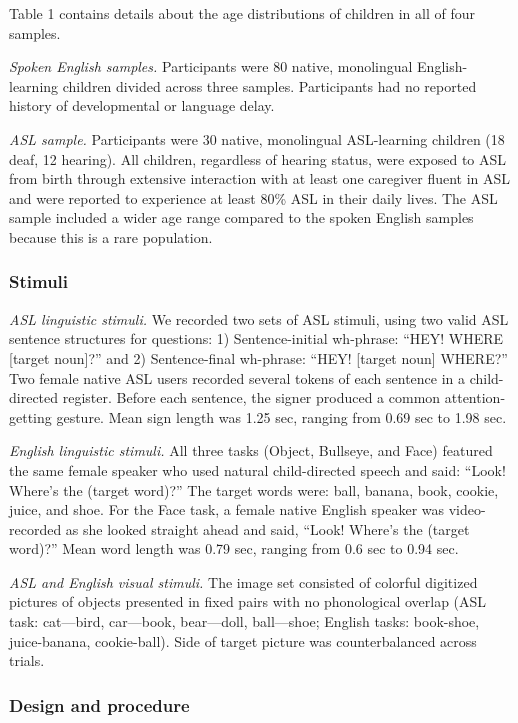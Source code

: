 \documentclass[10pt, letterpaper]{article}
\begin{document}
Table 1 contains details about the age distributions of children in all
of four samples.

\emph{Spoken English samples.} Participants were 80 native, monolingual
English-learning children divided across three samples. Participants had
no reported history of developmental or language delay.

\emph{ASL sample.} Participants were 30 native, monolingual ASL-learning
children (18 deaf, 12 hearing). All children, regardless of hearing
status, were exposed to ASL from birth through extensive interaction
with at least one caregiver fluent in ASL and were reported to
experience at least 80\% ASL in their daily lives. The ASL sample
included a wider age range compared to the spoken English samples
because this is a rare population.

\subsubsection{Stimuli}\label{stimuli}

\emph{ASL linguistic stimuli.} We recorded two sets of ASL stimuli,
using two valid ASL sentence structures for questions: 1)
Sentence-initial wh-phrase: ``HEY! WHERE {[}target noun{]}?'' and 2)
Sentence-final wh-phrase: ``HEY! {[}target noun{]} WHERE?'' Two female
native ASL users recorded several tokens of each sentence in a
child-directed register. Before each sentence, the signer produced a
common attention-getting gesture. Mean sign length was 1.25 sec, ranging
from 0.69 sec to 1.98 sec.

\emph{English linguistic stimuli.} All three tasks (Object, Bullseye,
and Face) featured the same female speaker who used natural
child-directed speech and said: ``Look! Where's the (target word)?'' The
target words were: ball, banana, book, cookie, juice, and shoe. For the
Face task, a female native English speaker was video-recorded as she
looked straight ahead and said, ``Look! Where's the (target word)?''
Mean word length was 0.79 sec, ranging from 0.6 sec to 0.94 sec.

\emph{ASL and English visual stimuli.} The image set consisted of
colorful digitized pictures of objects presented in fixed pairs with no
phonological overlap (ASL task: cat---bird, car---book, bear---doll,
ball---shoe; English tasks: book-shoe, juice-banana, cookie-ball). Side
of target picture was counterbalanced across trials.

\subsubsection{Design and procedure}\label{design-and-procedure}
\end{document}
